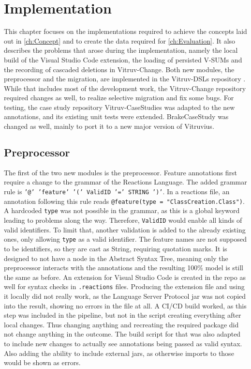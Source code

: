 \chapter{Implementation}
\label{ch:Implementation}

This chapter focuses on the implementations required to achieve the concepts laid out in \autoref{ch:Concept} and to create the data required for \autoref{ch:Evaluation}.
It also describes the problems that arose during the implementation, namely the local build of the Visual Studio Code extension, the loading of persisted V-SUMs and the recording of cascaded deletions in Vitruv-Change.
Both new modules, the preprocessor and the migration, are implemented in the Vitruv-DSLs repository \cite{vitruv-dsls-fork}.
While that includes most of the development work, the Vitruv-Change repository \cite{vitruv-change-fork} required changes as well, to realize selective migration and fix some bugs.
For testing, the case study repository Vitruv-CaseStudies \cite{vitruv-casestudies-fork} was adapted to the new annotations, and its existing unit tests were extended.
BrakeCaseStudy \cite{brakecasestudy-fork} was changed as well, mainly to port it to a new major version of Vitruvius.

\section{Preprocessor}
\label{sec:Implementation:Preprocessor}

The first of the two new modules is the preprocessor.
Feature annotations first require a change to the grammar of the Reactions Language.
The added grammar rule is \texttt{'@' 'feature' '(' ValidID '=' STRING ')'}.
In a reactions file, an annotation following this rule reads \texttt{@feature(type = "ClassCreation.Class")}.
A hardcoded \texttt{type} was not possible in the grammar, as this is a global keyword leading to problems along the way.
Therefore, \texttt{ValidID} would enable all kinds of valid identifiers.
To limit that, another validation is added to the already existing ones, only allowing \texttt{type} as a valid identifier.
The feature names are not supposed to be identifiers, so they are cast as String, requiring quotation marks.
It is designed to not have a node in the Abstract Syntax Tree, meaning only the preprocessor interacts with the annotations and the resulting 100\% model is still the same as before.
An extension for Visual Studio Code is created in the repo as well for syntax checks in \texttt{.reactions} files.
Producing the extension file and using it locally did not really work, as the Language Server Protocol jar was not copied into the result, showing no errors in the file at all.
A CI/CD build worked, as this step was included in the pipeline, but not in the script creating everything after local changes.
Thus changing anything and recreating the required package did not change anything in the outcome.
The build script for that was also adapted to include new changes to actually see annotations being passed as valid syntax.
Also adding the ability to include external jars, as otherwise imports to those would be shown as errors.

